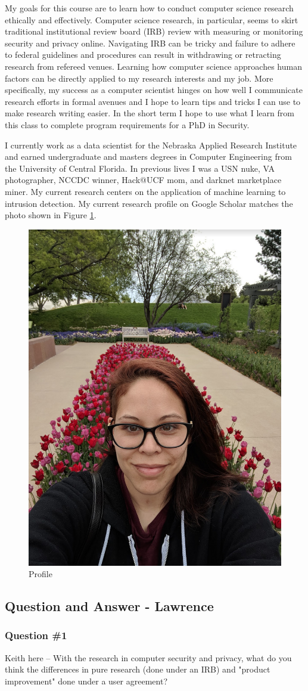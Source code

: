 My goals for this course are to learn how to conduct computer science research ethically and effectively. Computer science research, in particular, seems to skirt traditional institutional review board (IRB) review with measuring or monitoring security and privacy online. Navigating IRB can be tricky and failure to adhere to federal guidelines and procedures can result in withdrawing or retracting research from refereed venues. Learning how computer science approaches human factors can be directly applied to my research interests and my job. More specifically, my success as a computer scientist hinges on how well I communicate research efforts in formal avenues and I hope to learn tips and tricks I can use to make research writing easier. In the short term I hope to use what I learn from this class to complete program requirements for a PhD in Security.

I currently work as a data scientist for the Nebraska Applied Research Institute and earned undergraduate and masters degrees in Computer Engineering from the University of Central Florida. In previous lives I was a USN nuke, VA photographer, NCCDC winner, Hack@UCF mom, and darknet marketplace miner. My current research centers on the application of machine learning to intrusion detection. My current research profile on Google Scholar matches the photo shown in Figure \ref{fig:profile}.

\begin{figure}[h!]
   \centering
    \includegraphics[width=.35\textwidth]{lawrence.png}
    \caption{Profile}
    \label{fig:profile}
\end{figure}

\subsection{Question and Answer - Lawrence}
\subsubsection{Question \#1}
Keith here -- With the research in computer security and privacy, what do you think the differences in pure research (done under an IRB) and "product improvement" done under a user agreement?

